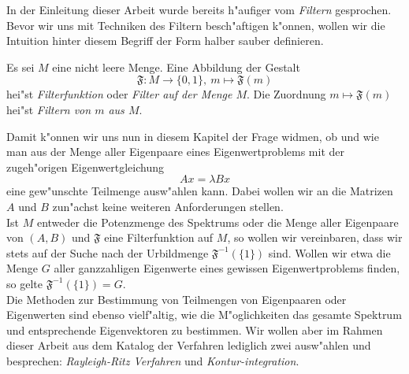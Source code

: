 In der Einleitung dieser Arbeit wurde bereits h"aufiger vom \emph{Filtern} gesprochen.
Bevor wir uns mit Techniken des Filtern besch"aftigen k"onnen, wollen wir die Intuition hinter diesem Begriff der Form halber sauber definieren.

\begin{defn}[Filter]\label{defn:chap3:filter}
Es sei $M$ eine nicht leere Menge. Eine Abbildung der Gestalt
\[
\mathfrak{F}\colon M \to \{0,1\},\ %
m\mapsto\mathfrak{F}(m)
\]
hei"st \emph{Filterfunktion} oder \emph{Filter auf der Menge $M$}. Die Zuordnung $m\mapsto\mathfrak{F}(m)$ hei"st \emph{Filtern von $m$ aus $M$}.
\end{defn}

Damit k"onnen wir uns nun in diesem Kapitel der Frage widmen, ob und wie man aus der Menge aller Eigenpaare eines Eigenwertproblems mit der zugeh"origen Eigenwertgleichung
\[
Ax = \lambda Bx
\]
eine gew"unschte Teilmenge ausw"ahlen kann.
Dabei wollen wir an die Matrizen $A$ und $B$ zun"achst keine weiteren Anforderungen stellen.\\

Ist $M$ entweder die Potenzmenge des Spektrums oder die Menge aller Eigenpaare von $(A,B)$ und $\mathfrak{F}$ eine Filterfunktion auf $M$, so wollen wir vereinbaren, dass wir stets auf der Suche nach der Urbildmenge $\mathfrak{F}^{-1}(\{ 1\})$ sind.
Wollen wir etwa die Menge $G$ aller ganzzahligen Eigenwerte eines gewissen Eigenwertproblems finden, so gelte $\mathfrak{F}^{-1}(\{1\}) = G$.\\

Die Methoden zur Bestimmung von Teilmengen von Eigenpaaren oder Eigenwerten sind ebenso vielf"altig, wie die M"oglichkeiten das gesamte Spektrum und entsprechende Eigenvektoren zu bestimmen.
Wir wollen aber im Rahmen dieser Arbeit aus dem Katalog der Verfahren lediglich zwei ausw"ahlen und besprechen: \emph{Rayleigh-Ritz Verfahren} und \emph{Kontur-integration}.

\newpage

